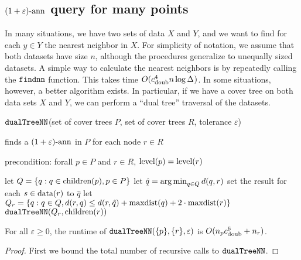 \documentclass[../main.tex]{subfiles}
\makeatletter
\newcommand{\dist}[2]{\distf({#1},{#2})}
\newcommand{\distf}{d}
\newcommand{\aspect}[1]{\Delta_{#1}}
\newcommand{\cdoub}{c_\textnormal{doub}}
\newcommand{\mkfunction}[1]{\ifmmode{\textnormal{{#1}}}}
\newcommand{\level}[1]      {\mkfunction{level}({#1})}
\newcommand{\children}[1]   {\mkfunction{children}({#1})}
\newcommand{\covdist}[1]    {\mkfunction{covdist}({#1})}
\newcommand{\maxdist}[1]    {\mkfunction{maxdist}({#1})}
\newcommand{\data}[1]       {\mkfunction{data}({#1})}
\newcommand{\nn}[1]         {\mkfunction{nn}[{#1}]}
\def\nn{\@ifstar\@nn\@@nn}
\def\@nn#1{\mkfunction{nn}^*[{#1}]}
\def\@@nn#1{\mkfunction{nn}[{#1}]}
\newcommand{\mkprocedure}[1]{\textnormal{\ttfamily {#1}}}
\newcommand{\findnn}{\mkprocedure{findnn}}
\newcommand{\dualnn}{\ensuremath{\textnormal{\ttfamily dualTreeNN}}}
\makeatother
\begin{document}

\subsection{$(1+\varepsilon)\text{-ann}$ query for many points}

In many situations, we have two sets of data $X$ and $Y$,
and we want to find for each $y\in Y$ the nearest neighbor in $X$.
For simplicity of notation, we assume that both datasets have size $n$,
although the procedures generalize to unequally sized datasets.
A simple way to calculate the nearest neighbors is by repeatedly calling the $\findnn$ function.
This takes time $O(\cdoub^4 n\log \aspect{})$.
In some situations, however, a better algorithm exists.
In particular, if we have a cover tree on both data sets $X$ and $Y$,
we can perform a ``dual tree'' traversal of the datasets.


\newpage
\begin{algorithm}[h]
    \caption{$\dualnn$(set of cover trees $P$, set of cover trees $R$, tolerance $\varepsilon$)}
\vspace{0.1in}
finds a $(1+\varepsilon)\text{-ann}$ in $P$ for each node $r\in R$

precondition: forall $p\in P$ and $r \in R$, $\level p = \level r$
\begin{algorithmic}[1]
    \State let $Q = \{ q: q \in \children p, p\in P \}$
        \State let $\hat q = \argmin_{q\in Q} \dist{q}{r}$
        \If {$Q = \{\hat q\}$ \textbf{or} $\dist{x}{\hat q} \ge 2\cdot\covdist{\hat q}(1+1/\varepsilon)$}
            \label{line:dualnnorig:if}
            \State set the result for each $s\in\data r$ to $\hat q$
        \Else
            \State let $Q_r = \{ q : q \in Q, \dist{r}{q} \le \dist{r}{\hat q} + \maxdist{q} + 2\cdot \maxdist{r} \}$
            \State $\dualnn(Q_r,\children r)$
        \EndIf
    \EndFor
\end{algorithmic}
\end{algorithm}

\begin{theorem}
    For all $\varepsilon \ge 0$,
    the runtime of $\dualnn(\{p\}, \{r\}, \varepsilon)$ is $O(n_p\cdoub^6+n_r)$.
\end{theorem}
\begin{proof}
    First we bound the total number of recursive calls to $\dualnn$. 

\end{proof}
\end{document}
